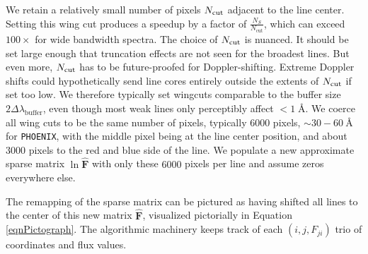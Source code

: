\documentclass[twocolumn]{aastex631}
\begin{document}
We retain a relatively small number of pixels $N_{\rm cut}$ adjacent to the line center. Setting this wing cut produces a speedup by a factor of $\frac{N_S}{N_{\mathrm{cut}}}$, which can exceed $100\times$ for wide bandwidth spectra. The choice of $N_{\rm cut}$ is nuanced.  It should be set large enough that truncation effects are not seen for the broadest lines.  But even more, $N_{\rm cut}$ has to be future-proofed for Doppler-shifting. Extreme Doppler shifts could hypothetically send line cores entirely outside the extents of $N_{\rm cut}$ if set too low.  We therefore typically set wingcuts comparable to the buffer size $2 \Delta \lambda_{\mathrm{buffer}}$, even though most weak lines only perceptibly affect $<1\;$\AA. We coerce all wing cuts to be the same number of pixels, typically 6000 pixels, $\sim30-60~$\AA~ for \texttt{PHOENIX}, with the middle pixel being at the line center position, and about 3000 pixels to the red and blue side of the line. We populate a new approximate sparse matrix $\ln{\bm{\hat{F}}}$ with only these $6000$ pixels per line and assume zeros everywhere else.

The remapping of the sparse matrix can be pictured as having shifted all lines to the center of this new matrix $\bm{\hat{F}}$, visualized pictorially in Equation \ref{eqnPictograph}.  The algorithmic machinery keeps track of each $(i, j, F_{ji})$ trio of coordinates and flux values.
\end{document}

